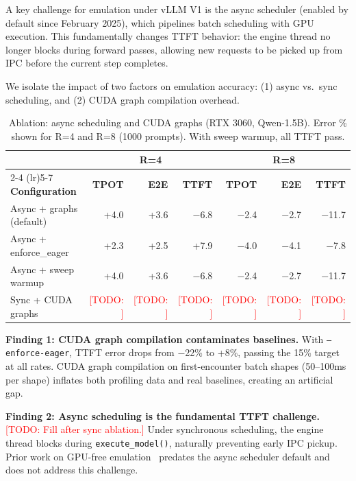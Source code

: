 \documentclass[conference]{IEEEtran}
\newcommand{\todo}[1]{\textcolor{red}{[TODO: #1]}}
\begin{document}
A key challenge for emulation under vLLM V1 is the async scheduler (enabled by default since February 2025), which pipelines batch scheduling with GPU execution. This fundamentally changes TTFT behavior: the engine thread no longer blocks during forward passes, allowing new requests to be picked up from IPC before the current step completes.

We isolate the impact of two factors on emulation accuracy: (1) async vs.\ sync scheduling, and (2) CUDA graph compilation overhead.

\begin{table}[t!]
\centering
\caption{Ablation: async scheduling and CUDA graphs (RTX 3060, Qwen-1.5B). Error \% shown for R=4 and R=8 (1000 prompts). With sweep warmup, all TTFT pass.}
\label{tab:ablation_async}
\footnotesize
\begin{tabular}{lrrrrrr}
\toprule
 & \multicolumn{3}{c}{\textbf{R=4}} & \multicolumn{3}{c}{\textbf{R=8}} \\
\cmidrule(lr){2-4} \cmidrule(lr){5-7}
\textbf{Configuration} & \textbf{TPOT} & \textbf{E2E} & \textbf{TTFT} & \textbf{TPOT} & \textbf{E2E} & \textbf{TTFT} \\
\midrule
Async + graphs (default)   & +4.0 & +3.6 & $-$6.8  & $-$2.4 & $-$2.7 & $-$11.7 \\
Async + enforce\_eager      & +2.3 & +2.5 & +7.9   & $-$4.0 & $-$4.1 & $-$7.8 \\
Async + sweep warmup        & +4.0 & +3.6 & $-$6.8  & $-$2.4 & $-$2.7 & $-$11.7 \\
Sync + CUDA graphs          & \todo{} & \todo{} & \todo{} & \todo{} & \todo{} & \todo{} \\
\bottomrule
\end{tabular}
\end{table}

\textbf{Finding 1: CUDA graph compilation contaminates baselines.} With \texttt{--enforce-eager}, TTFT error drops from $-$22\% to +8\%, passing the 15\% target at all rates. CUDA graph compilation on first-encounter batch shapes (50--100ms per shape) inflates both profiling data and real baselines, creating an artificial gap.

\textbf{Finding 2: Async scheduling is the fundamental TTFT challenge.} \todo{Fill after sync ablation.} Under synchronous scheduling, the engine thread blocks during \texttt{execute\_model()}, naturally preventing early IPC pickup. Prior work on GPU-free emulation~\cite{agrawal2024revati} predates the async scheduler default and does not address this challenge.
\end{document}
